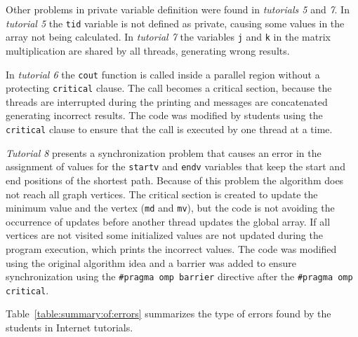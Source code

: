 Other problems in private variable definition were found in \emph{tutorials 5} and \emph{7}. In \emph{tutorial 5} the \texttt{tid} variable is not defined as private, causing some values in the array not being calculated. In \emph{tutorial 7} the variables \texttt{j} and \texttt{k} in the matrix multiplication are shared by all threads, generating wrong results.

In \emph{tutorial 6} the \texttt{cout} function is called inside a parallel region without a protecting \texttt{critical} clause. The call becomes a critical section, because the threads are interrupted during the printing and messages are concatenated generating incorrect results. The code was modified by students using the \texttt{critical} clause to ensure that the call is executed by one thread at a time.

\emph{Tutorial 8} presents a synchronization problem that causes an error in the assignment of values for the \texttt{startv} and \texttt{endv} variables that keep the start and end positions of the shortest path. Because of this problem the algorithm does not reach all graph vertices. The critical section is created to update the minimum value and the vertex (\texttt{md} and \texttt{mv}), but the code is not avoiding the occurrence of updates before another thread updates the global array. If all vertices are not visited some initialized values are not updated during the program execution, which prints the incorrect values. The code was modified using the original algorithm idea and a barrier was added to ensure synchronization using the \texttt{\#pragma omp barrier} directive after the \texttt{\#pragma omp critical}.

Table~\ref{table:summary:of:errors} summarizes the type of errors found by the students in Internet tutorials.

